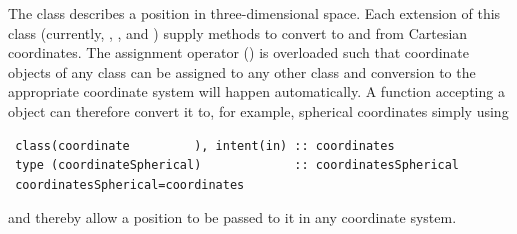 The  class describes a position in three-dimensional space. Each extension of this class (currently, , , and ) supply methods to convert to and from Cartesian coordinates. The assignment operator (\mono{=}) is overloaded such that coordinate objects of any class can be assigned to any other class and conversion to the appropriate coordinate system will happen automatically. A function accepting a  object can therefore convert it to, for example, spherical coordinates simply using
\begin{verbatim}
 class(coordinate         ), intent(in) :: coordinates
 type (coordinateSpherical)             :: coordinatesSpherical
 coordinatesSpherical=coordinates
\end{verbatim}
and thereby allow a position to be passed to it in any coordinate system.
